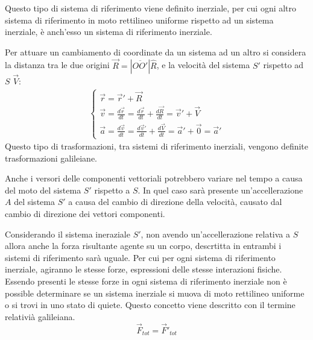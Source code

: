 \documentclass{article}
\numberwithin{equation}{subsection}
\begin{document}
Questo tipo di sistema di riferimento viene definito 
inerziale, per cui ogni altro sistema di riferimento in moto rettilineo uniforme rispetto ad un sistema inerziale, è anch'esso un sistema di riferimento inerziale. 


Per attuare un 
cambiamento di coordinate da un sistema ad un altro si 
considera la distanza tra le due origini 
$\vec{R}=\left|\overline{OO'}\right|\hat{R}$, e la velocità del 
sistema $S'$ rispetto ad $S$ $\vec{V}$:
\begin{gather}
    \begin{cases}
        \vec{r}=\vec{r}'+\vec{R}\\
        \vec{v}=\displaystyle\frac{d\vec{r}}{dt}=\frac{d\vec{r}}{dt}+\frac{d\vec{R}}{dt}=\vec{v}'+\vec{V}\\
        \vec{a}=\displaystyle\frac{d\vec{v}}{dt}=\frac{d\vec{v}'}{dt}+\frac{d\vec{V}}{dt}=\vec{a}'+\vec{0}=\vec{a}'
    \end{cases}
\end{gather}
Questo tipo di trasformazioni, tra sistemi di riferimento inerziali, vengono definite trasformazioni galileiane. 



Anche i versori delle componenti vettoriali potrebbero variare nel 
tempo a causa del moto del sistema $S'$ rispetto a $S$. In quel 
caso sarà presente un'accellerazione $A$ del sistema $S'$ a 
causa del cambio di direzione della velocità, causato dal cambio 
di direzione dei vettori componenti. 


Considerando il sistema 
ineraziale $S'$, non avendo un'accellerazione relativa a $S$ 
allora anche la forza risultante agente su un corpo, descrtitta 
in entrambi i sistemi di riferimento sarà uguale. Per cui per ogni sistema di riferimento inerziale, agiranno le stesse forze, espressioni delle stesse interazioni fisiche. 
Essendo presenti le stesse forze in ogni sistema di riferimento inerziale non è possible determinare se un sistema inerziale si muova 
di moto rettilineo uniforme o si trovi in uno stato di quiete. Questo concetto viene descritto con il termine relativià galileiana. 
\begin{equation}
    \vec{F}_{tot}=\vec{F}'_{tot}
\end{equation}
\end{document}
